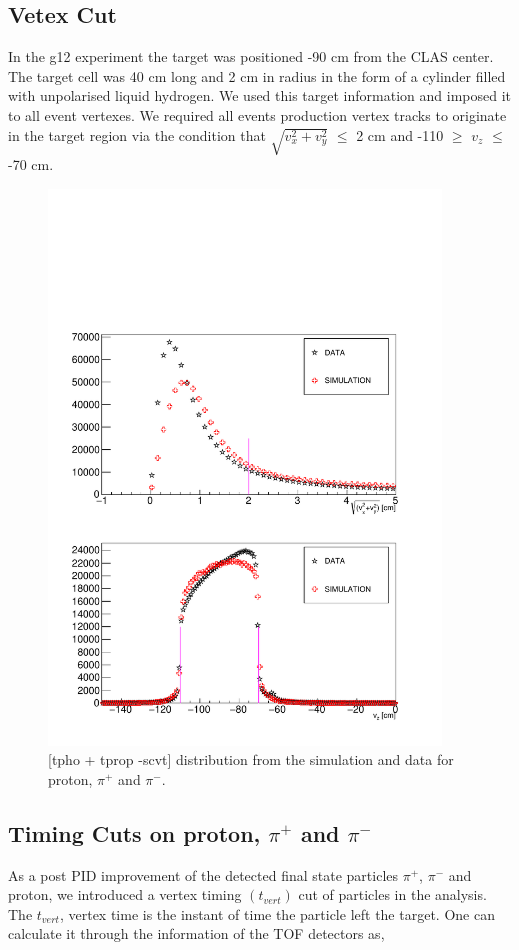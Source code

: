 \documentclass[12pt,a4paper]{amsbook}
\theoremstyle{definition}
\begin{document}
\subsection{Vetex Cut}
\label{VCut}
In the g12 experiment the target was positioned -90 cm from the CLAS center. The target cell was 40 cm long and 2 cm in radius in the form of a cylinder filled with unpolarised liquid hydrogen. We used this target information and imposed it to all event vertexes. We required all events  production vertex tracks to originate in the target region via the condition that $\sqrt{v_{x}^{2} + v_{y}^{2}}$ $\leq$ 2 cm and -110 $\geq$ $v_{z}$ $\leq$ -70 cm. 

\begin{figure}[ht!]
\centerline{
\includegraphics[height=5.8in]{vertex.pdf}}
\caption{[tpho + tprop -scvt] distribution from the simulation and data for proton, $\pi^{+}$ and $\pi^{-}$.}
\label{Fig1}
\end{figure}

\subsection{Timing Cuts on proton, $\pi^{+}$ and $\pi^{-}$}
\label{TCut}
As a post PID improvement of the detected final state particles $\pi^{+}$, $\pi^{-}$ and proton, we introduced a vertex timing $(t_{vert})$ cut of particles in the analysis. The $t_{vert}$, vertex time is the instant of time the particle left the target. One can calculate it through the information of the TOF detectors as,
\end{document}

